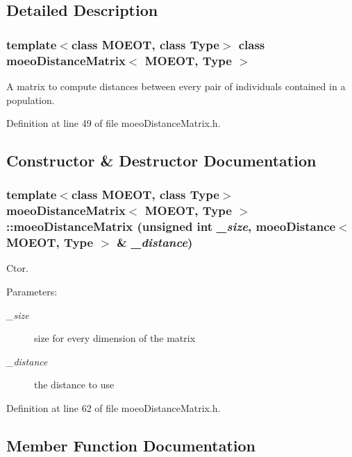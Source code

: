 \subsection{Detailed Description}
\subsubsection*{template$<$class MOEOT, class Type$>$ class moeo\-Distance\-Matrix$<$ MOEOT, Type $>$}

A matrix to compute distances between every pair of individuals contained in a population. 



Definition at line 49 of file moeo\-Distance\-Matrix.h.

\subsection{Constructor \& Destructor Documentation}
\subsubsection{\setlength{\rightskip}{0pt plus 5cm}template$<$class MOEOT, class Type$>$ \bf{moeo\-Distance\-Matrix}$<$ MOEOT, Type $>$::\bf{moeo\-Distance\-Matrix} (unsigned int {\em \_\-size}, \bf{moeo\-Distance}$<$ MOEOT, Type $>$ \& {\em \_\-distance})\hspace{0.3cm}{\tt  [inline]}}\label{classmoeoDistanceMatrix_5526260bd46b6877abd700a15b9b9ee8}


Ctor. 

\begin{Desc}
\item[Parameters:]
\begin{description}
\item[{\em \_\-size}]size for every dimension of the matrix \item[{\em \_\-distance}]the distance to use \end{description}
\end{Desc}


Definition at line 62 of file moeo\-Distance\-Matrix.h.

\subsection{Member Function Documentation}

